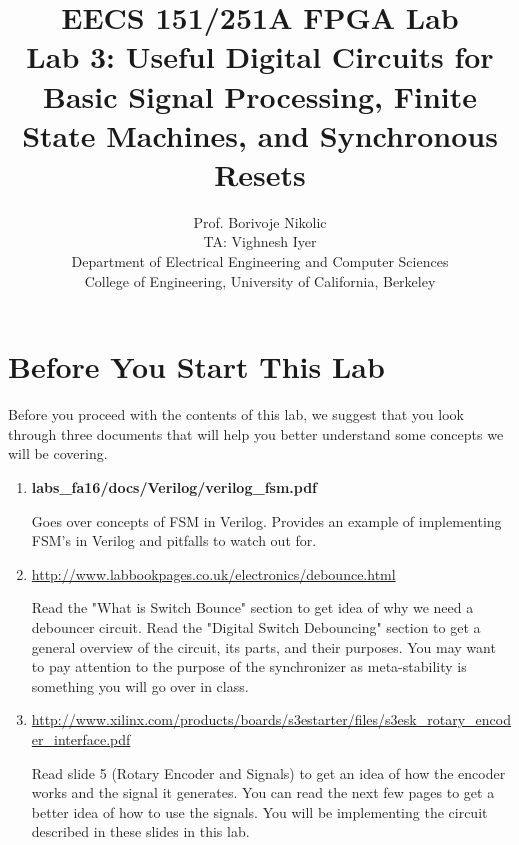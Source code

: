 \documentclass[11pt]{article}
\begin{document}
\title{EECS 151/251A FPGA Lab\\
Lab 3: Useful Digital Circuits for Basic Signal Processing, Finite State Machines, and Synchronous Resets}

\author{Prof. Borivoje Nikolic \\
TA: Vighnesh Iyer \\Department of Electrical Engineering and Computer Sciences\\
College of Engineering, University of California, Berkeley}
\date{}
\maketitle

\section{Before You Start This Lab}

Before you proceed with the contents of this lab, we suggest that you look through three documents that will help you better understand some concepts we will be covering.

\begin{enumerate}
	\item \textbf{labs\_fa16/docs/Verilog/verilog\_fsm.pdf}
	
	Goes over concepts of FSM in Verilog. Provides an example of  implementing FSM's in Verilog and pitfalls to watch out for.
	
	\item \url{http://www.labbookpages.co.uk/electronics/debounce.html}
	
	Read the "What is Switch Bounce" section to get idea of why we need a debouncer circuit. Read the "Digital Switch Debouncing" section to get a general overview of the circuit, its parts, and their purposes. You may want to pay attention to the purpose of the synchronizer as meta-stability is something you will go over in class.
	
	\item \url{http://www.xilinx.com/products/boards/s3estarter/files/s3esk_rotary_encoder_interface.pdf}
	
	Read slide 5 (Rotary Encoder and Signals) to get an idea of how the encoder works and the signal it generates. You can read the next few pages to get a better idea of how to use the signals. You will be implementing the circuit described in these slides in this lab.

\end{enumerate}
\end{document}
